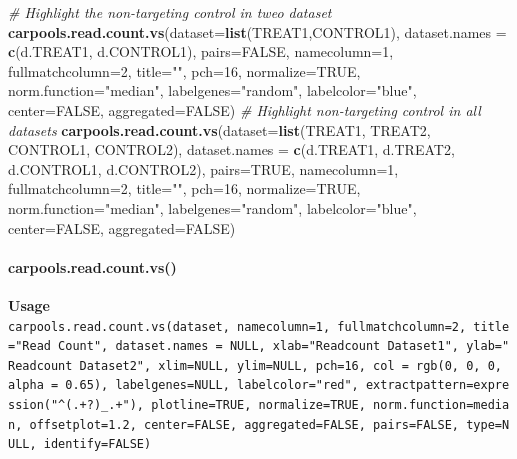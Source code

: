 \documentclass[]{article}
\newenvironment{Shaded}{\begin{snugshade}}{\end{snugshade}}
\newcommand{\KeywordTok}[1]{\textcolor[rgb]{0.13,0.29,0.53}{\textbf{{#1}}}}
\newcommand{\DataTypeTok}[1]{\textcolor[rgb]{0.13,0.29,0.53}{{#1}}}
\newcommand{\DecValTok}[1]{\textcolor[rgb]{0.00,0.00,0.81}{{#1}}}
\newcommand{\StringTok}[1]{\textcolor[rgb]{0.31,0.60,0.02}{{#1}}}
\newcommand{\CommentTok}[1]{\textcolor[rgb]{0.56,0.35,0.01}{\textit{{#1}}}}
\newcommand{\OtherTok}[1]{\textcolor[rgb]{0.56,0.35,0.01}{{#1}}}
\newcommand{\NormalTok}[1]{{#1}}
\let\oldparagraph\paragraph
\renewcommand{\paragraph}[1]{\oldparagraph{#1}\mbox{}}
\begin{document}
\begin{Shaded}
\begin{Highlighting}[]
\CommentTok{# Highlight the non-targeting control in tweo dataset}
\KeywordTok{carpools.read.count.vs}\NormalTok{(}\DataTypeTok{dataset=}\KeywordTok{list}\NormalTok{(TREAT1,CONTROL1), }\DataTypeTok{dataset.names =} \KeywordTok{c}\NormalTok{(d.TREAT1, d.CONTROL1),}
  \DataTypeTok{pairs=}\OtherTok{FALSE}\NormalTok{, }\DataTypeTok{namecolumn=}\DecValTok{1}\NormalTok{, }\DataTypeTok{fullmatchcolumn=}\DecValTok{2}\NormalTok{, }\DataTypeTok{title=}\StringTok{""}\NormalTok{, }\DataTypeTok{pch=}\DecValTok{16}\NormalTok{,}
  \DataTypeTok{normalize=}\OtherTok{TRUE}\NormalTok{, }\DataTypeTok{norm.function=}\StringTok{"median"}\NormalTok{, }\DataTypeTok{labelgenes=}\StringTok{"random"}\NormalTok{, }\DataTypeTok{labelcolor=}\StringTok{"blue"}\NormalTok{,}
  \DataTypeTok{center=}\OtherTok{FALSE}\NormalTok{, }\DataTypeTok{aggregated=}\OtherTok{FALSE}\NormalTok{)}
\CommentTok{# Highlight non-targeting control in all datasets}
\KeywordTok{carpools.read.count.vs}\NormalTok{(}\DataTypeTok{dataset=}\KeywordTok{list}\NormalTok{(TREAT1, TREAT2, CONTROL1, CONTROL2),}
  \DataTypeTok{dataset.names =} \KeywordTok{c}\NormalTok{(d.TREAT1, d.TREAT2, d.CONTROL1, d.CONTROL2), }\DataTypeTok{pairs=}\OtherTok{TRUE}\NormalTok{, }\DataTypeTok{namecolumn=}\DecValTok{1}\NormalTok{,}
  \DataTypeTok{fullmatchcolumn=}\DecValTok{2}\NormalTok{, }\DataTypeTok{title=}\StringTok{""}\NormalTok{, }\DataTypeTok{pch=}\DecValTok{16}\NormalTok{, }\DataTypeTok{normalize=}\OtherTok{TRUE}\NormalTok{, }\DataTypeTok{norm.function=}\StringTok{"median"}\NormalTok{,}
  \DataTypeTok{labelgenes=}\StringTok{"random"}\NormalTok{, }\DataTypeTok{labelcolor=}\StringTok{"blue"}\NormalTok{, }\DataTypeTok{center=}\OtherTok{FALSE}\NormalTok{, }\DataTypeTok{aggregated=}\OtherTok{FALSE}\NormalTok{)}
\end{Highlighting}
\end{Shaded}

\paragraph{carpools.read.count.vs()}\label{carpools.read.count.vs}

\textbf{Usage}\\
\texttt{carpools.read.count.vs(dataset,\ namecolumn=1,\ fullmatchcolumn=2,\ title="Read\ Count",\ dataset.names\ =\ NULL,\ xlab="Readcount\ Dataset1",\ ylab="Readcount\ Dataset2",\ xlim=NULL,\ ylim=NULL,\ pch=16,\ col\ =\ rgb(0,\ 0,\ 0,\ alpha\ =\ 0.65),\ labelgenes=NULL,\ labelcolor="red",\ extractpattern=expression("\^{}(.+?)\_.+"),\ plotline=TRUE,\ normalize=TRUE,\ norm.function=median,\ offsetplot=1.2,\ center=FALSE,\ aggregated=FALSE,\ pairs=FALSE,\ type=NULL,\ identify=FALSE)}
\end{document}
